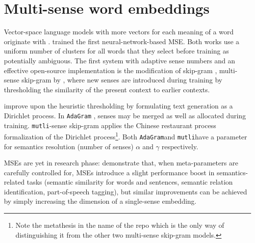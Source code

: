 \documentclass[11pt]{article}
\newcommand{\adagram}{\texttt{AdaGram}}
\newcommand{\mutli}{\texttt{mutli}}
\begin{document}
\section{Multi-sense word embeddings}

Vector-space language models with more vectors for each meaning of a
word originate with \cite{Reisinger:2010}.
\cite{Huang:2012} trained the first neural-network-based MSE.
Both works use a uniform number of clusters for all words that they select
before training as potentially ambiguous.
The first system with adaptive sense numbers and an effective open-source
implementation is the 
modification of skip-gram \cite{Mikolov:2013d}, multi-sense skip-gram by
\cite{Neelakantan:2014}, where new senses are introduced during training by
thresholding the similarity of the present context to earlier contexts.




\cite{Bartunov:2015,Li:2015} improve upon the heuristic thresholding by
formulating text generation as a Dirichlet process. In \adagram
\citep{Bartunov:2015}, senses may be merged as well as allocated during
training. \mutli-sense skip-gram \citep{Li:2015} applies the Chinese restaurant
process formalization of the Dirichlet process\footnote{Note the metathesis in
the name of the repo which is the only way of distinguishing it from the other
two multi-sense skip-gram models.}. Both \adagram and \mutli have a parameter for
semantics resolution (number of senses) $\alpha$ and $\gamma$ respectively. 


MSEs are yet in
research phase: \cite{Li:2015}  demonstrate that, when meta-parameters are
carefully controlled for, MSEs introduce a slight performance boost in
semantics-related tasks (semantic similarity for words and sentences, semantic
relation identification, part-of-speech tagging), but similar improvements can
be achieved by simply increasing the dimension of a single-sense embedding.
\end{document}
